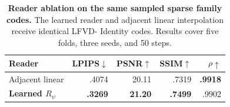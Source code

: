 \begin{table}[t]
\centering
\caption{\textbf{Reader ablation on the same sampled sparse family codes.}
The learned reader and adjacent linear interpolation receive identical LFVD-
Identity codes. Results cover five folds, three seeds, and 50 steps.}
\label{tab:reader_ablation}
\scriptsize
\setlength{\tabcolsep}{3.1pt}
\begin{tabular*}{\linewidth}{@{\extracolsep{\fill}}lrrrr@{}}
\toprule
Reader & LPIPS$\downarrow$ & PSNR$\uparrow$ & SSIM$\uparrow$ & $\rho\uparrow$ \\
\midrule
Adjacent linear & .4074 & 20.11 & .7319 & \textbf{.9918} \\
\textbf{Learned $R_\psi$} & \textbf{.3269} & \textbf{21.20} & \textbf{.7499} & .9902 \\
\bottomrule
\end{tabular*}
\end{table}
